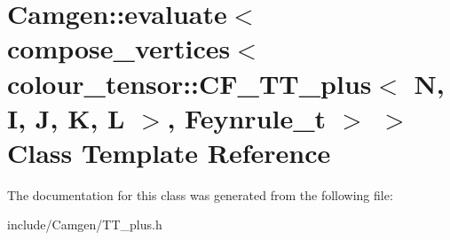 \hypertarget{a00163}{\section{Camgen\-:\-:evaluate$<$ compose\-\_\-vertices$<$ colour\-\_\-tensor\-:\-:C\-F\-\_\-\-T\-T\-\_\-plus$<$ N, I, J, K, L $>$, Feynrule\-\_\-t $>$ $>$ Class Template Reference}
\label{a00163}
}


The documentation for this class was generated from the following file\-:\begin{DoxyCompactItemize}
\item 
include/\-Camgen/T\-T\-\_\-plus.\-h\end{DoxyCompactItemize}
